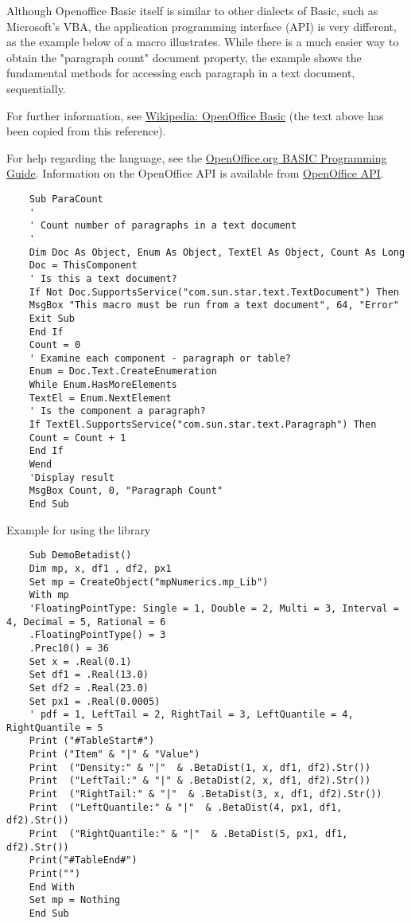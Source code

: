 	\vpara
	Although Openoffice Basic itself is similar to other dialects of Basic, such as Microsoft's VBA, the application programming interface (API) is very different, as the example below of a macro illustrates. While there is a much easier way to obtain the "paragraph count" document property, the example shows the fundamental methods for accessing each paragraph in a text document, sequentially.
	
	\vpara
	For further information, see \href{http://en.wikipedia.org/wiki/OpenOffice_Basic}{Wikipedia: OpenOffice Basic} (the text above has been copied from this reference).
	
	\vpara
	For help regarding the language, see the \href{http://wiki.openoffice.org/wiki/Documentation/BASIC_Guide}{OpenOffice.org BASIC Programming Guide}.
	Information on the OpenOffice API is available from  \href{http://www.openoffice.org/api/}{OpenOffice API}.
	
	\begin{lstlisting}
	Sub ParaCount
	'
	' Count number of paragraphs in a text document
	'
	Dim Doc As Object, Enum As Object, TextEl As Object, Count As Long
	Doc = ThisComponent
	' Is this a text document?
	If Not Doc.SupportsService("com.sun.star.text.TextDocument") Then
	MsgBox "This macro must be run from a text document", 64, "Error"
	Exit Sub
	End If
	Count = 0
	' Examine each component - paragraph or table?
	Enum = Doc.Text.CreateEnumeration
	While Enum.HasMoreElements
	TextEl = Enum.NextElement
	' Is the component a paragraph?
	If TextEl.SupportsService("com.sun.star.text.Paragraph") Then
	Count = Count + 1
	End If
	Wend
	'Display result
	MsgBox Count, 0, "Paragraph Count"
	End Sub
	\end{lstlisting}
	
	
	\noindent Example for using the library
	
	\begin{lstlisting}
	Sub DemoBetadist()
	Dim mp, x, df1 , df2, px1 
	Set mp = CreateObject("mpNumerics.mp_Lib")
	With mp
	'FloatingPointType: Single = 1, Double = 2, Multi = 3, Interval = 4, Decimal = 5, Rational = 6
	.FloatingPointType() = 3
	.Prec10() = 36
	Set x = .Real(0.1)
	Set df1 = .Real(13.0)
	Set df2 = .Real(23.0)
	Set px1 = .Real(0.0005)	
	' pdf = 1, LeftTail = 2, RightTail = 3, LeftQuantile = 4, RightQuantile = 5
	Print ("#TableStart#")
	Print ("Item" & "|" & "Value")
	Print  ("Density:" & "|"  & .BetaDist(1, x, df1, df2).Str())
	Print  ("LeftTail:" & "|" & .BetaDist(2, x, df1, df2).Str())
	Print  ("RightTail:" & "|"  & .BetaDist(3, x, df1, df2).Str())
	Print  ("LeftQuantile:" & "|"  & .BetaDist(4, px1, df1, df2).Str())
	Print  ("RightQuantile:" & "|"  & .BetaDist(5, px1, df1, df2).Str())
	Print("#TableEnd#")
	Print("")
	End With
	Set mp = Nothing
	End Sub\end{lstlisting}
	

